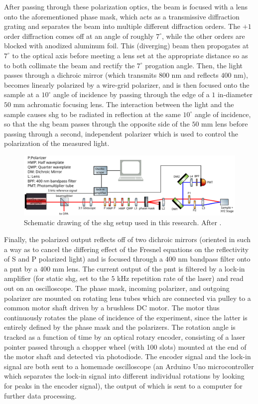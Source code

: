 After passing through these polarization optics, the beam is focused with a lens onto the aforementioned phase mask, which acts as a transmissive diffraction grating and separates the beam into multiple different diffraction orders.
The $+1$ order diffraction comes off at an angle of roughly $7^\circ$, while the other orders are blocked with anodized aluminum foil. 
This (diverging) beam then propogates at $7^\circ$ to the optical axis before meeting a lens set at the appropriate distance so as to both collimate the beam and rectify the $7^\circ$ progation angle.
Then, the light passes through a dichroic mirror (which transmits $800$ \si{nm} and reflects $400$ \si{nm}), becomes linearly polarized by a wire-grid polarizer, and is then focused onto the sample at a $10^\circ$ angle of incidence by passing through the edge of a $1$ \si{in}-diameter $50$ \si{mm} achromatic focusing lens.
The interaction between the light and the sample causes \gls{shg} to be radiated in reflection at the same $10^\circ$ angle of incidence, so that the \gls{shg} beam passes through the opposite side of the $50$ \si{mm} lens before passing through a second, independent polarizer which is used to control the polarization of the measured light.

\begin{figure}
\includegraphics[width=\textwidth]{gfx/ch3/pdf/setup.pdf}
\caption{\label{fig:setup}Schematic drawing of the \gls{shg} setup used in this research. After \citet{morey_automated_2024}.}
\end{figure}

Finally, the polarized output reflects off of two dichroic mirrors (oriented in such a way as to cancel the differing effect of the Fresnel equations on the reflectivity of S and P polarized light) and is focused through a $400$ \si{nm} bandpass filter onto a \gls{pmt} by a $400$ \si{mm} lens.
The current output of the \gls{pmt} is filtered by a lock-in amplifier (for static \gls{shg}, set to the $5$ \si{kHz} repetition rate of the laser) and read out on an oscilloscope.
The phase mask, incoming polarizer, and outgoing polarizer are mounted on rotating lens tubes which are connected via pulley to a common motor shaft driven by a brushless DC motor.
The motor thus continuously rotates the plane of incidence of the experiment, since the latter is entirely defined by the phase mask and the polarizers.
The rotation angle is tracked as a function of time by an optical rotary encoder, consisting of a laser pointer passed through a chopper wheel (with 100 slots) mounted at the end of the motor shaft and detected via photodiode.
The encoder signal and the lock-in signal are both sent to a homemade oscilloscope (an Arduino Uno microcontroller which separates the lock-in signal into different individual rotations by looking for peaks in the encoder signal), the output of which is sent to a computer for further data processing.

